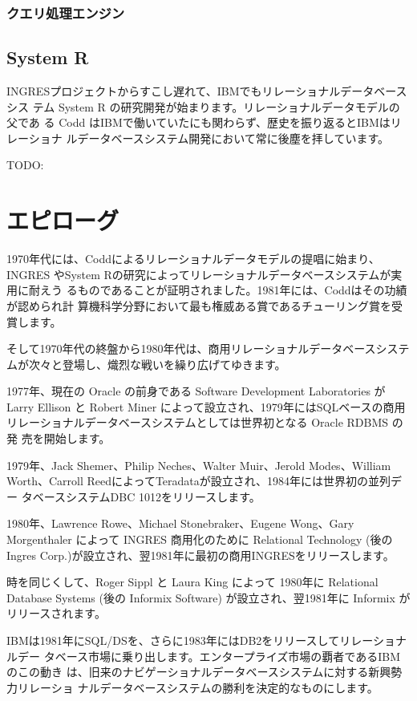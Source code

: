 \subsubsection{クエリ処理エンジン}

\subsection{System R}

INGRESプロジェクトからすこし遅れて、IBMでもリレーショナルデータベースシス
テム System R の研究開発が始まります。リレーショナルデータモデルの父であ
る Codd はIBMで働いていたにも関わらず、歴史を振り返るとIBMはリレーショナ
ルデータベースシステム開発において常に後塵を拝しています。

TODO:

\section{エピローグ}

1970年代には、Coddによるリレーショナルデータモデルの提唱に始まり、INGRES
やSystem Rの研究によってリレーショナルデータベースシステムが実用に耐えう
るものであることが証明されました。1981年には、Coddはその功績が認められ計
算機科学分野において最も権威ある賞であるチューリング賞を受賞します。

そして1970年代の終盤から1980年代は、商用リレーショナルデータベースシステ
ムが次々と登場し、熾烈な戦いを繰り広げてゆきます。

1977年、現在の Oracle の前身である Software Development Laboratories が
Larry Ellison と Robert Miner によって設立され、1979年にはSQLベースの商用
リレーショナルデータベースシステムとしては世界初となる Oracle RDBMS の発
売を開始します。

1979年、Jack Shemer、Philip Neches、Walter Muir、Jerold Modes、William
Worth、Carroll ReedによってTeradataが設立され、1984年には世界初の並列デー
タベースシステムDBC 1012をリリースします。

1980年、Lawrence Rowe、Michael Stonebraker、Eugene Wong、Gary
Morgenthaler によって INGRES 商用化のために Relational Technology (後の
Ingres Corp.)が設立され、翌1981年に最初の商用INGRESをリリースします。

時を同じくして、Roger Sippl と Laura King によって 1980年に Relational
Database Systems (後の Informix Software) が設立され、翌1981年に
Informix がリリースされます。

IBMは1981年にSQL/DSを、さらに1983年にはDB2をリリースしてリレーショナルデー
タベース市場に乗り出します。エンタープライズ市場の覇者であるIBMのこの動き
は、旧来のナビゲーショナルデータベースシステムに対する新興勢力リレーショ
ナルデータベースシステムの勝利を決定的なものにします。

